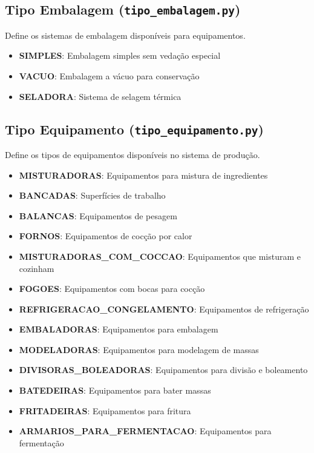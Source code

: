 \documentclass[11pt,a4paper]{article}
\begin{document}
\subsection{Tipo Embalagem (\texttt{tipo\_embalagem.py})}

Define os sistemas de embalagem disponíveis para equipamentos.

\begin{itemize}[leftmargin=2cm]
    \item \textbf{SIMPLES}: Embalagem simples sem vedação especial
    \item \textbf{VACUO}: Embalagem a vácuo para conservação
    \item \textbf{SELADORA}: Sistema de selagem térmica
\end{itemize}

\subsection{Tipo Equipamento (\texttt{tipo\_equipamento.py})}

Define os tipos de equipamentos disponíveis no sistema de produção.

\begin{itemize}[leftmargin=2cm]
    \item \textbf{MISTURADORAS}: Equipamentos para mistura de ingredientes
    \item \textbf{BANCADAS}: Superfícies de trabalho
    \item \textbf{BALANCAS}: Equipamentos de pesagem
    \item \textbf{FORNOS}: Equipamentos de cocção por calor
    \item \textbf{MISTURADORAS\_COM\_COCCAO}: Equipamentos que misturam e cozinham
    \item \textbf{FOGOES}: Equipamentos com bocas para cocção
    \item \textbf{REFRIGERACAO\_CONGELAMENTO}: Equipamentos de refrigeração
    \item \textbf{EMBALADORAS}: Equipamentos para embalagem
    \item \textbf{MODELADORAS}: Equipamentos para modelagem de massas
    \item \textbf{DIVISORAS\_BOLEADORAS}: Equipamentos para divisão e boleamento
    \item \textbf{BATEDEIRAS}: Equipamentos para bater massas
    \item \textbf{FRITADEIRAS}: Equipamentos para fritura
    \item \textbf{ARMARIOS\_PARA\_FERMENTACAO}: Equipamentos para fermentação
\end{itemize}
\end{document}
